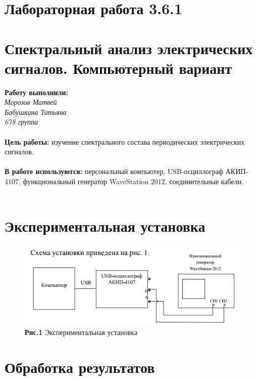 \documentclass[11pt,a4paper]{article}
\begin{document}
	\part*{Лабораторная работа 3.6.1}
	\part*{Спектральный анализ электрических сигналов. Компьютерный вариант}
	\textbf{Работу выполнили:} \\
	{\itshape Морозов Матвей \\ Бабушкина Татьяна \\ 678 группа} \\\\
\textbf{Цель работы:} изучение спектрального состава периодических электрических сигналов.
\\\\
\textbf {В работе используются:} персональный компьютер, USB-осциллограф АКИП-$4107$, функциональный генератор WaveStation $2012$, соединительные кабели.
\\
\\
\part*{Экспериментальная установка}
\begin{figure}[h!]
	\centering
	\includegraphics[width=0.6\linewidth]{1}
	\\
	\textbf{Рис.1} Экспериментальная установка
\end{figure}
\part*{Обработка результатов}
\end{document}
